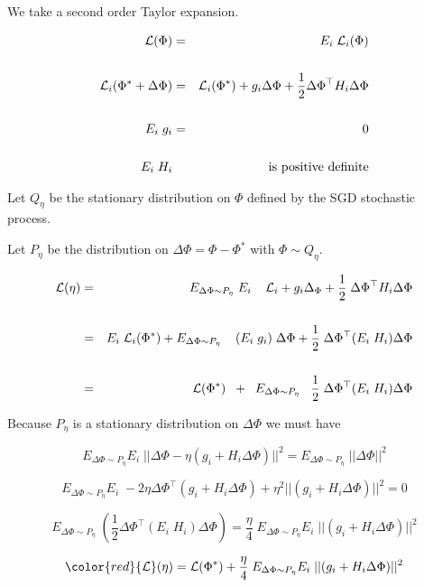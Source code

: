 {\vfill
We take a second order Taylor expansion.

\begin{eqnarray*}
{\cal L}(\Phi) & = & E_i\;{\cal L}_i(\Phi) \\
\\
{\cal L}_i(\Phi^* + \Delta \Phi) & = & {\cal L}_i(\Phi^*) + g_i \Delta \Phi + \frac{1}{2} \Delta\Phi^\top H_i \Delta\Phi \\
\\
E_i\; g_i & = & 0\\
\\
E_i\; H_i & & \mbox{is positive definite}
\end{eqnarray*}


Let $Q_\eta$ be the stationary distribution on $\Phi$ defined by the SGD stochastic process.

\vfill
Let $P_\eta$ be the distribution on $\Delta\Phi = \Phi - \Phi^*$ with $\Phi \sim Q_\eta$.

\begin{eqnarray*}
{\cal L}(\eta) & = & \;\;\; E_{\Delta \Phi \sim P_\eta}\;E_i \;\;\;\; {\cal L}_i + g_i\Delta _\Phi + \frac{1}{2}\;\Delta \Phi^\top H_i \Delta \Phi \\
\\
& = & E_i\; {\cal L}_i(\Phi^*) + E_{\Delta \Phi \sim P_\eta} \;\;\;\;(E_i\;g_i) \;\Delta \Phi + \frac{1}{2}\;\Delta \Phi^\top (E_i\; H_i) \Delta \Phi \\
\\
& = & {\cal L}(\Phi^*)\;\; + \;\; E_{\Delta \Phi \sim P_\eta}\;\;\;\frac{1}{2}\;\Delta \Phi^\top (E_i\;H_i) \Delta \Phi
\end{eqnarray*}

Because $P_\eta$ is a stationary distribution on $\Delta \Phi$ we must have

$$E_{\Delta \Phi \sim P_\eta}E_i\; ||\Delta \Phi - \eta (g_i + H_i\Delta \Phi)||^2 = E_{\Delta \Phi \sim P_\eta}\; ||\Delta \Phi||^2$$

\vfill
$$E_{\Delta \Phi \sim P_\eta}E_i\;-2\eta \Delta \Phi^\top (g_i + H_i\Delta \Phi) +\eta^2||(g_i + H_i\Delta \Phi)||^2 = 0$$

\vfill
$$E_{\Delta \Phi \sim P_\eta}\;\left(\frac{1}{2}\Delta \Phi^\top (E_i \;H_i)\Delta \Phi\right) = \frac{\eta}{4}\;E_{\Delta \Phi \sim P_\eta}E_i \;||(g_i + H_i\Delta \Phi)||^2$$

\vfill
$${\color{red} {\cal L}(\eta)  = {\cal L}(\Phi^*) + \frac{\eta}{4}\;E_{\Delta \Phi \sim P_\eta}E_i \;||(g_i + H_i\Delta \Phi)||^2}$$

}
